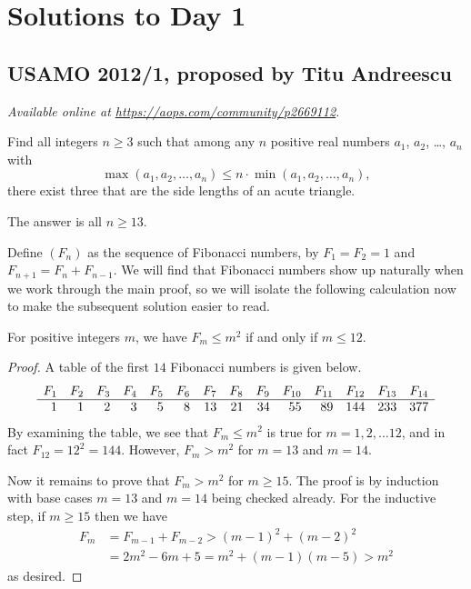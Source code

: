 \documentclass[11pt]{scrartcl}
\begin{document}
\section{Solutions to Day 1}
\subsection{USAMO 2012/1, proposed by Titu Andreescu}
\textsl{Available online at \url{https://aops.com/community/p2669112}.}
\begin{mdframed}[style=mdpurplebox,frametitle={Problem statement}]
Find all integers $n \ge 3$ such that
among any $n$ positive real numbers
$a_1$, $a_2$, \dots, $a_n$ with
\[ \max(a_1,a_2,\dots,a_n)
  \le n \cdot \min(a_1,a_2,\dots,a_n), \]
there exist three that are the side lengths
of an acute triangle.
\end{mdframed}
The answer is all $n \ge 13$.

Define $(F_n)$ as the sequence of Fibonacci numbers,
by $F_1 = F_2 = 1$ and $F_{n+1} = F_n + F_{n-1}$.
We will find that Fibonacci numbers show up naturally
when we work through the main proof,
so we will isolate the following calculation now
to make the subsequent solution easier to read.
\begin{claim*}
  For positive integers $m$, we have $F_m \le m^2$ if and only if $m \le 12$.
\end{claim*}
\begin{proof}
  A table of the first $14$ Fibonacci numbers is given below.
  \[
    \begin{array}{rrrrr rrrrr rrrr}
      F_1 & F_2 & F_3 & F_4 & F_5 & F_6 & F_7 & F_8 & F_9
        & F_{10} & F_{11} & F_{12} & F_{13} & F_{14} \\ \hline
      1 & 1 & 2 & 3 & 5 & 8 & 13 & 21 & 34 & 55 & 89 & 144 & 233 & 377
    \end{array}
  \]
  By examining the table, we see that $F_m \le m^2$ is true for $m = 1, 2, \dots 12$,
  and in fact $F_{12} = 12^2 = 144$.
  However, $F_m > m^2$ for $m = 13$ and $m = 14$.

  Now it remains to prove that $F_m > m^2$ for $m \ge 15$.
  The proof is by induction with base cases
  $m = 13$ and $m = 14$ being checked already.
  For the inductive step, if $m \ge 15$ then we have
  \begin{align*}
    F_m &= F_{m-1} + F_{m-2} > (m-1)^2 + (m-2)^2 \\
    &= 2m^2 - 6m + 5 = m^2 + (m-1)(m-5) > m^2
  \end{align*}
  as desired.
\end{proof}
\end{document}
